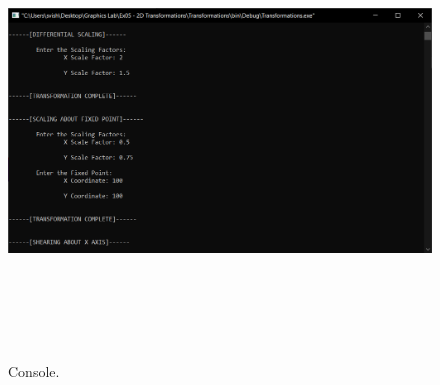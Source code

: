 \documentclass[12pt, a4]{article}
\begin{document}
\subsection*{}
\begin{figure}[h]
\centering
\caption{Console.}
\includegraphics[height=12cm, width=17cm]{Outputs/Console-11.png}
\end{figure}

\newpage
\end{document}
